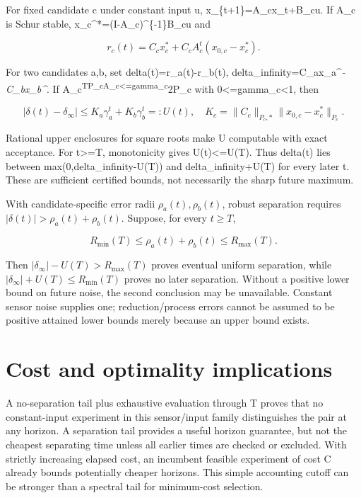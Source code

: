 \documentclass[
  11pt,
  a4paper,
]{report}
\begin{document}
For fixed candidate c under constant input u, x\_\{t+1\}=A\_cx\_t+B\_cu.
If A\_c is Schur stable, x\_c\^{}*=(I-A\_c)\^{}\{-1\}B\_cu and

\[
r_c(t)=C_cx_c^*+C_cA_c^t(x_{0,c}-x_c^*).
\]

For two candidates a,b, set delta(t)=r\_a(t)-r\_b(t),
delta\_infinity=C\_ax\_a\^{}\emph{-C\_bx\_b\^{}}. If
A\_c\textsuperscript{TP\_cA\_c\textless=gamma\_c}2P\_c with
0\textless=gamma\_c\textless1, then

\[
|\delta(t)-\delta_\infty|\le K_a\gamma_a^t+K_b\gamma_b^t=:U(t),
\quad K_c=\|C_c\|_{P_c,*}\|x_{0,c}-x_c^*\|_{P_c}.
\]

Rational upper enclosures for square roots make U computable with exact
acceptance. For t\textgreater=T, monotonicity gives U(t)\textless=U(T).
Thus \textbar delta(t)\textbar{} lies between
max(0,\textbar delta\_infinity\textbar-U(T)) and
\textbar delta\_infinity\textbar+U(T) for every later t. These are
sufficient certified bounds, not necessarily the sharp future maximum.

With candidate-specific error radii \(\rho_a(t),\rho_b(t)\), robust
separation requires \(\lvert\delta(t)\rvert>\rho_a(t)+\rho_b(t)\).
Suppose, for every \(t\ge T\),

\[
R_{\min}(T)\le\rho_a(t)+\rho_b(t)\le R_{\max}(T).
\]

Then \(\lvert\delta_\infty\rvert-U(T)>R_{\max}(T)\) proves eventual
uniform separation, while
\(\lvert\delta_\infty\rvert+U(T)\le R_{\min}(T)\) proves no later
separation. Without a positive lower bound on future noise, the second
conclusion may be unavailable. Constant sensor noise supplies one;
reduction/process errors cannot be assumed to be positive attained lower
bounds merely because an upper bound exists.

\hypertarget{cost-and-optimality-implications}{%
\section{Cost and optimality
implications}\label{cost-and-optimality-implications}}

A no-separation tail plus exhaustive evaluation through T proves that no
constant-input experiment in this sensor/input family distinguishes the
pair at any horizon. A separation tail provides a useful horizon
guarantee, but not the cheapest separating time unless all earlier times
are checked or excluded. With strictly increasing elapsed cost, an
incumbent feasible experiment of cost C already bounds potentially
cheaper horizons. This simple accounting cutoff can be stronger than a
spectral tail for minimum-cost selection.
\end{document}
